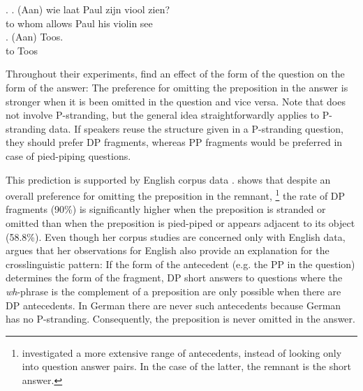 \ex. \ag. (Aan) wie laat Paul zijn viool zien?\\
      to  whom allows Paul his violin see\\
      \bg. (Aan) Toos.\\
      to Toos\\

Throughout their experiments, \citet{levelt.kelter1982} find an effect of the form of the question on the form of the answer: The preference for omitting the preposition in the answer is stronger when it is been omitted in the question and vice versa. Note that \Last does not involve P-stranding, but the general idea straightforwardly applies to P-stranding data. If speakers reuse the structure given in a P-stranding question, they should prefer DP fragments, whereas PP fragments would be preferred in case of pied-piping questions. 

This prediction is supported by English corpus data \citep{nykiel2014, nykiel2017}. \citet{nykiel2017} shows that despite an overall preference for omitting the preposition in the remnant,%
%
\footnote{\citet{nykiel2017} investigated a more extensive range of antecedents, instead of looking only into question answer pairs. In the case of the latter, the remnant is the short answer.}\afterfn%
%
the rate of DP fragments (90\%) is significantly higher when the preposition is stranded or omitted than when the preposition is pied-piped or appears adjacent to its object (58.8\%). Even though her corpus studies are concerned only with English data, \citet[41--42]{nykiel2017} argues that her observations for English also provide an explanation for the crosslinguistic pattern: If the form of the antecedent (e.g. the PP in the question) determines the form of the fragment, DP short answers to questions where the \textit{wh}-phrase is the complement of a preposition are only possible when there are DP antecedents. In German there are never such antecedents because German has no P-stranding. Consequently, the preposition is never omitted in the answer.

